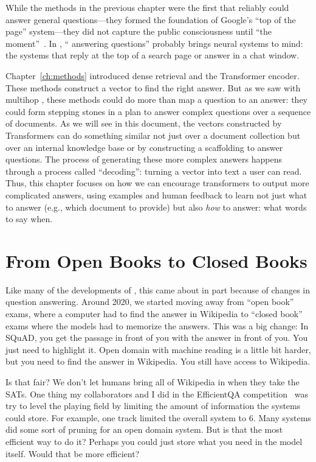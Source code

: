 

\label{chapter:formats}


While the methods in the previous chapter were the first that reliably could answer general questions---they formed the foundation of Google's ``top of the page''  system---they did not capture the public consciousness until ``the \chatgpt{} moment''~\cite{}.
%
In \currentyear{},
`` answering questions'' probably brings neural systems to
mind: the systems that reply at the top of a search page or answer in
a chat window.

Chapter~\ref{ch:methods} introduced dense retrieval and the Transformer encoder.
%
These methods construct a vector to find the right answer.
%
But as we saw with multihop , these methods could do more than map a question to an answer: they could form stepping stones in a plan to answer complex questions over a sequence of documents.
%
As we will see in this document, the vectors constructed by Transformers can do something similar not just over a document collection but over an internal knowledge base or by constructing a scaffolding to answer questions. 
%
The process of generating these more complex answers happens through a process called ``decoding'': turning a vector into text a user can read.
%
Thus, this chapter focuses on how we can encourage transformers to output more complicated answers, using examples and human feedback to learn not just what to answer (e.g., which document to provide) but also \emph{how} to answer: what words to say when.

\section{From Open Books to Closed Books}
\label{sec:methods:generation}

Like many of the developments of , this came about in part because of changes in question answering.
%
Around 2020, we started moving away from ``open book'' exams, where a computer had to find the answer in Wikipedia to ``closed book'' exams where the models had to memorize the answers.  
%
This was a big change: In SQuAD, you get the passage in front of you with the answer in front of you.  You just need to highlight it.  Open domain  with machine reading is a little bit harder, but you need to find the answer in Wikipedia.  You still have access to Wikipedia.

Is that fair?  We don't let humans bring all of Wikipedia in when they take the SATs.  
%
One thing my collaborators and I did in the EfficientQA competition~\citep{min2021efficientqa} was try to level the playing field by limiting the amount of information the systems could store.  
%
For example, one track limited the overall system to 6.  Many systems did some sort of pruning for an open domain  system.  But is that the most efficient way to do it?  Perhaps you could just store what you need in the model itself.  Would that be more efficient?

